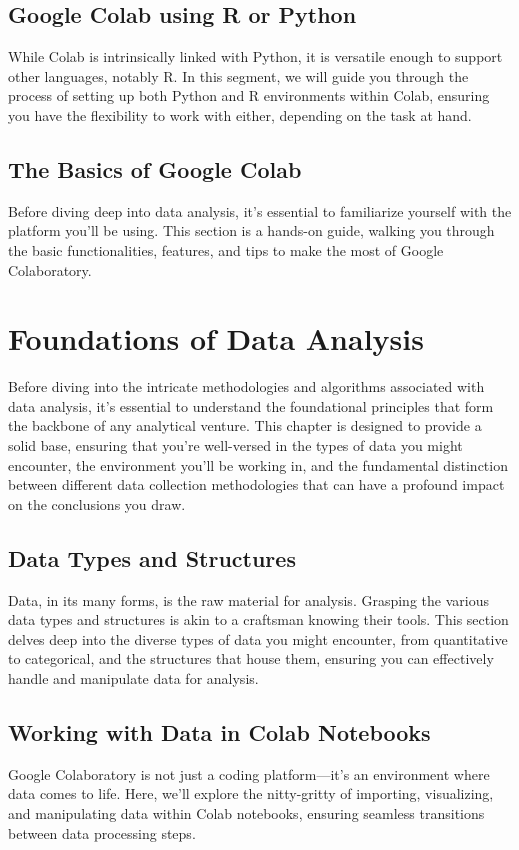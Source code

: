 \documentclass{book}
\begin{document}
\section{Google Colab using R or Python}
While Colab is intrinsically linked with Python, it is versatile enough to support other languages, notably R. In this segment, we will guide you through the process of setting up both Python and R environments within Colab, ensuring you have the flexibility to work with either, depending on the task at hand.

\section{The Basics of Google Colab}
Before diving deep into data analysis, it's essential to familiarize yourself with the platform you'll be using. This section is a hands-on guide, walking you through the basic functionalities, features, and tips to make the most of Google Colaboratory.

\chapter{Foundations of Data Analysis}
Before diving into the intricate methodologies and algorithms associated with data analysis, it's essential to understand the foundational principles that form the backbone of any analytical venture. This chapter is designed to provide a solid base, ensuring that you're well-versed in the types of data you might encounter, the environment you'll be working in, and the fundamental distinction between different data collection methodologies that can have a profound impact on the conclusions you draw.

\section{Data Types and Structures}
Data, in its many forms, is the raw material for analysis. Grasping the various data types and structures is akin to a craftsman knowing their tools. This section delves deep into the diverse types of data you might encounter, from quantitative to categorical, and the structures that house them, ensuring you can effectively handle and manipulate data for analysis.

\section{Working with Data in Colab Notebooks}
Google Colaboratory is not just a coding platform—it's an environment where data comes to life. Here, we'll explore the nitty-gritty of importing, visualizing, and manipulating data within Colab notebooks, ensuring seamless transitions between data processing steps.
\end{document}
